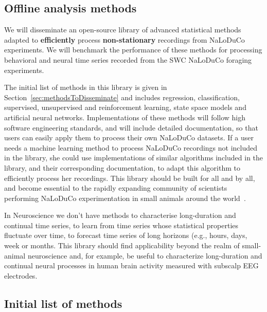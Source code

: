 \documentclass[12pt]{article}
\begin{document}
\subsection{Offline analysis methods}

We will disseminate an open-source library of advanced statistical methods
adapted to \textbf{efficiently} process \textbf{non-stationary} recordings from
NaLoDuCo experiments.
%
We will benchmark the performance of these methods for processing behavioral
and neural time series recorded from the SWC NaLoDuCo foraging experiments.

The initial list of methods in this library is given in
Section~\ref{sec:methodsToDisseminate} and includes regression, classification,
supervised, unsupervised and reinforcement learning, state space models and
artificial neural networks.
%
Implementations of these methods will follow high software engineering
standards, and will include detailed documentation, so that users can easily
apply them to process their own NaLoDuCo datasets.
%
If a user needs a machine learning method to process NaLoDuCo recordings not
included in the library, she could use implementations of similar algorithms
included in the library, and their corresponding documentation, to adapt this
algorithm to efficiently process her recordings.
%
This library should be built for all and by all, and become essential to the
rapidly expanding community of scientists performing NaLoDuCo experimentation
in small animals around the world~\citep{}.

In Neuroscience we don't have methods to characterise long-duration and
continual time series, to learn from time series whose statistical properties
fluctuate over time, to forecast time series of long horizons (e.g., hours,
days, week or months.
%
This library should find applicability beyond the realm of small-animal
neuroscience and, for example, be useful to characterize long-duration and
continual neural processes in human brain activity measured with subscalp EEG
electrodes.

\subsection{Initial list of methods}
\end{document}
